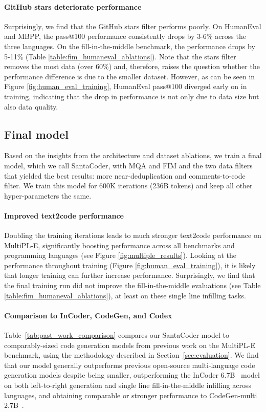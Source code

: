 \documentclass[10pt]{article} \usepackage{iclr2023_conference,times}
\begin{document}
\paragraph{GitHub stars deteriorate performance} Surprisingly, we find that the GitHub stars filter performs poorly. On HumanEval and MBPP, the pass@100 performance consistently drops by 3-6\% across the three languages. On the fill-in-the-middle benchmark, the performance drops by 5-11\% (Table \ref{table:fim_humaneval_ablations}). Note that the stars filter removes the most data (over 60\%) and, therefore, raises the question whether the performance difference is due to the smaller dataset. However, as can be seen in Figure \ref{fig:human_eval_training}, HumanEval pass@100 diverged early on in training, indicating that the drop in performance is not only due to data size but also data quality. 


\subsection{Final model}
\label{sec:final_model}
Based on the insights from the architecture and dataset ablations, we train a final model, which we call SantaCoder, with MQA and FIM and the two data filters that yielded the best results: more near-deduplication and comments-to-code filter. We train this model for 600K iterations (236B tokens) and keep all other hyper-parameters the same. 

\paragraph{Improved text2code performance} Doubling the training iterations leads to much stronger text2code performance on MultiPL-E, significantly boosting performance across all benchmarks and programming languages (see Figure \ref{fig:multiple_results}). Looking at the performance throughout training (Figure \ref{fig:human_eval_training}), it is likely that longer training can further increase performance. Surprisingly, we find that the final training run did not improve the fill-in-the-middle evaluations (see Table \ref{table:fim_humaneval_ablations}), at least on these single line infilling tasks. 


\paragraph{Comparison to InCoder, CodeGen, and Codex} 

Table~\ref{tab:past_work_comparison} compares our SantaCoder model
to comparably-sized code generation models from previous work on the MultiPL-E benchmark, using the methodology described in  Section~\ref{sec:evaluation}.  
We find that our model generally outperforms previous open-source multi-language code generation models despite being smaller, outperforming the InCoder 6.7B~\citep{fried2022incoder} model on both left-to-right generation and single line fill-in-the-middle infilling across languages, and obtaining comparable or stronger performance to CodeGen-multi 2.7B~\citep{Nijkamp2022ACP}. 
\end{document}

